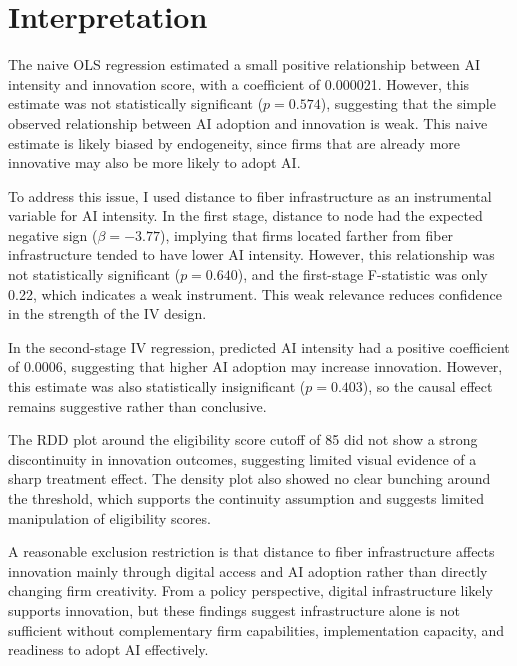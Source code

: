 \documentclass[12pt]{article}
\begin{document}
\section*{Interpretation}

The naive OLS regression estimated a small positive relationship between AI intensity and innovation score, with a coefficient of 0.000021. However, this estimate was not statistically significant ($p = 0.574$), suggesting that the simple observed relationship between AI adoption and innovation is weak. This naive estimate is likely biased by endogeneity, since firms that are already more innovative may also be more likely to adopt AI.

To address this issue, I used distance to fiber infrastructure as an instrumental variable for AI intensity. In the first stage, distance to node had the expected negative sign ($\beta = -3.77$), implying that firms located farther from fiber infrastructure tended to have lower AI intensity. However, this relationship was not statistically significant ($p = 0.640$), and the first-stage F-statistic was only 0.22, which indicates a weak instrument. This weak relevance reduces confidence in the strength of the IV design.

In the second-stage IV regression, predicted AI intensity had a positive coefficient of 0.0006, suggesting that higher AI adoption may increase innovation. However, this estimate was also statistically insignificant ($p = 0.403$), so the causal effect remains suggestive rather than conclusive.

The RDD plot around the eligibility score cutoff of 85 did not show a strong discontinuity in innovation outcomes, suggesting limited visual evidence of a sharp treatment effect. The density plot also showed no clear bunching around the threshold, which supports the continuity assumption and suggests limited manipulation of eligibility scores.

A reasonable exclusion restriction is that distance to fiber infrastructure affects innovation mainly through digital access and AI adoption rather than directly changing firm creativity. From a policy perspective, digital infrastructure likely supports innovation, but these findings suggest infrastructure alone is not sufficient without complementary firm capabilities, implementation capacity, and readiness to adopt AI effectively.
\end{document}
